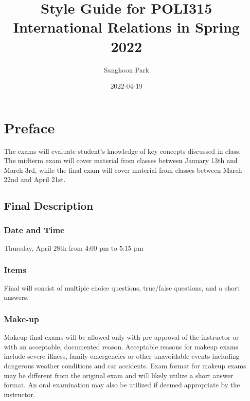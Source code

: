\documentclass[
]{book}
\title{Style Guide for POLI315 International Relations in Spring 2022}
\author{Sanghoon Park}
\date{2022-04-19}
\begin{document}
\maketitle

{
\setcounter{tocdepth}{1}
\tableofcontents
}
\hypertarget{preface}{%
\chapter*{Preface}\label{preface}}

The exams will evaluate student's knowledge of key concepts discussed in class. The midterm exam will cover material from classes between January 13th and March 3rd, while the final exam will cover material from classes between March 22nd and April 21st.

\hypertarget{final-description}{%
\section*{Final Description}\label{final-description}}

\hypertarget{date-and-time}{%
\subsection*{Date and Time}\label{date-and-time}}

Thursday, April 28th from 4:00 pm to 5:15 pm

\hypertarget{items}{%
\subsection*{Items}\label{items}}

Final will consist of multiple choice questions, true/false questions, and a short answers.

\hypertarget{make-up}{%
\subsection*{Make-up}\label{make-up}}

Makeup final exams will be allowed only with pre-approval of the instructor or with an acceptable, documented reason. Acceptable reasons for makeup exams include severe illness, family emergencies or other unavoidable events including dangerous weather conditions and car accidents. Exam format for makeup exams may be different from the original exam and will likely utilize a short answer format. An oral examination may also be utilized if deemed appropriate by the instructor.
\end{document}
